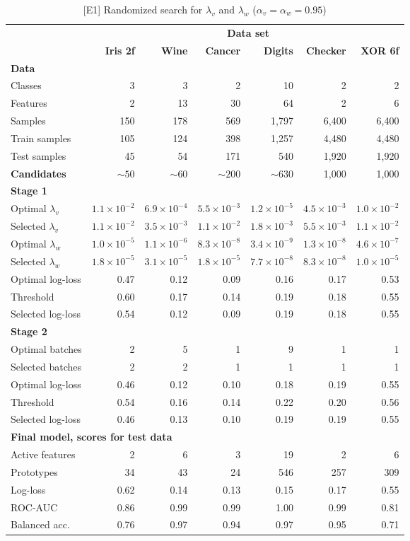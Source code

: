 \begin{table}
\caption{[E1] Randomized search for $\lambda_v$ and $\lambda_w$ ($\alpha_v=\alpha_w=0.95$)}
\label{tab_e1}
%
\begin{center}
\small
\begin{tabular}{|lrrrrrr|}
\hline
&\multicolumn{6}{c|}{\textbf{\hrulefill\ Data set \hrulefill}}\\
&\textbf{Iris 2f}&\textbf{Wine}&\textbf{Cancer}&\textbf{Digits}&\textbf{Checker}&\textbf{XOR 6f}\\
\multicolumn{7}{|l|}{\textbf{Data}}\\
Classes&3&3&2&10&2&2\\
Features&2&13&30&64&2&6\\
Samples&150&178&569&1,797&6,400&6,400\\
Train samples&105&124&398&1,257&4,480&4,480\\
Test samples&45&54&171&540&1,920&1,920\\
\textbf{Candidates}&$\sim50$&$\sim60$&$\sim200$&$\sim630$&1,000&1,000\\
\multicolumn{7}{|l|}{\textbf{Stage 1}}\\
Optimal $\lambda_v$&$1.1\times10^{-2}$&$6.9\times10^{-4}$&$5.5\times10^{-3}$&$1.2\times10^{-5}$&$4.5\times10^{-3}$&$1.0\times10^{-2}$\\
Selected $\lambda_v$&$1.1\times10^{-2}$&$3.5\times10^{-3}$&$1.1\times10^{-2}$&$1.8\times10^{-3}$&$5.5\times10^{-3}$&$1.1\times10^{-2}$\\
Optimal $\lambda_w$&$1.0\times10^{-5}$&$1.1\times10^{-6}$&$8.3\times10^{-8}$&$3.4\times10^{-9}$&$1.3\times10^{-8}$&$4.6\times10^{-7}$\\
Selected $\lambda_w$&$1.8\times10^{-5}$&$3.1\times10^{-5}$&$1.8\times10^{-5}$&$7.7\times10^{-8}$&$8.3\times10^{-8}$&$1.0\times10^{-5}$\\
Optimal log-loss&0.47&0.12&0.09&0.16&0.17&0.53\\
Threshold&0.60&0.17&0.14&0.19&0.18&0.55\\
Selected log-loss&0.54&0.12&0.09&0.19&0.18&0.55\\
\multicolumn{7}{|l|}{\textbf{Stage 2}}\\
Optimal batches&2&5&1&9&1&1\\
Selected batches&2&2&1&1&1&1\\
Optimal log-loss&0.46&0.12&0.10&0.18&0.19&0.55\\
Threshold&0.54&0.16&0.14&0.22&0.20&0.56\\
Selected log-loss&0.46&0.13&0.10&0.19&0.19&0.55\\
\multicolumn{7}{|l|}{\textbf{Final model, scores for test data}}\\
Active features&2&6&3&19&2&6\\
Prototypes&34&43&24&546&257&309\\
Log-loss&0.62&0.14&0.13&0.15&0.17&0.55\\
ROC-AUC&0.86&0.99&0.99&1.00&0.99&0.81\\
Balanced acc.&0.76&0.97&0.94&0.97&0.95&0.71\\
\hline
\end{tabular}
\end{center}
\end{table}
